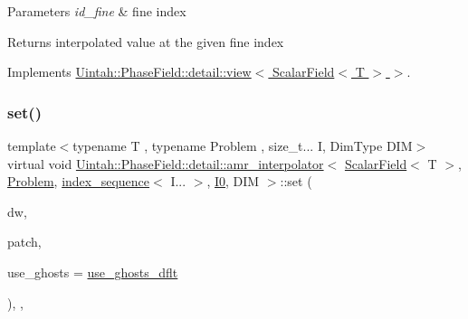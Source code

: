 \begin{DoxyParams}{Parameters}
{\em id\+\_\+fine} & fine index \\
\hline
\end{DoxyParams}
\begin{DoxyReturn}{Returns}
interpolated value at the given fine index 
\end{DoxyReturn}


Implements \hyperlink{classUintah_1_1PhaseField_1_1detail_1_1view_3_01ScalarField_3_01T_01_4_01_4_aea43cfedfe3b6f3c038ff795caec49b8}{Uintah\+::\+Phase\+Field\+::detail\+::view$<$ Scalar\+Field$<$ T $>$ $>$}.

\mbox{\label{classUintah_1_1PhaseField_1_1detail_1_1amr__interpolator_3_01ScalarField_3_01T_01_4_00_01Problem64f2458f98b03e27672a091eecc4b696_a75df9007f3338551abf056c9c2c32aad}} 
\subsubsection{\texorpdfstring{set()}{set()}\hspace{0.1cm}{\footnotesize\ttfamily [1/2]}}
{\footnotesize\ttfamily template$<$typename T , typename Problem , size\+\_\+t... I, Dim\+Type D\+IM$>$ \\
virtual void \hyperlink{classUintah_1_1PhaseField_1_1detail_1_1amr__interpolator}{Uintah\+::\+Phase\+Field\+::detail\+::amr\+\_\+interpolator}$<$ \hyperlink{structUintah_1_1PhaseField_1_1ScalarField}{Scalar\+Field}$<$ T $>$, \hyperlink{classUintah_1_1PhaseField_1_1Problem}{Problem}, \hyperlink{namespaceUintah_1_1PhaseField_a237de804d99512e50613aff7c94a9461}{index\+\_\+sequence}$<$ I... $>$, \hyperlink{namespaceUintah_1_1PhaseField_a547ce3002aa97fbd3ef3192a6eec8406abdd8ebcbdfd71d1125937e3012dc45fb}{I0}, D\+IM $>$\+::set (\begin{DoxyParamCaption}\item[{Data\+Warehouse $\ast$}]{dw,  }\item[{const Patch $\ast$}]{patch,  }\item[{bool}]{use\+\_\+ghosts = {\ttfamily \hyperlink{classUintah_1_1PhaseField_1_1detail_1_1amr__interpolator_3_01ScalarField_3_01T_01_4_00_01Problem64f2458f98b03e27672a091eecc4b696_a659b258bc11df07830b73859f57dee78}{use\+\_\+ghosts\+\_\+dflt}} }\end{DoxyParamCaption})\hspace{0.3cm}{\ttfamily [inline]}, {\ttfamily [override]}, {\ttfamily [virtual]}}



